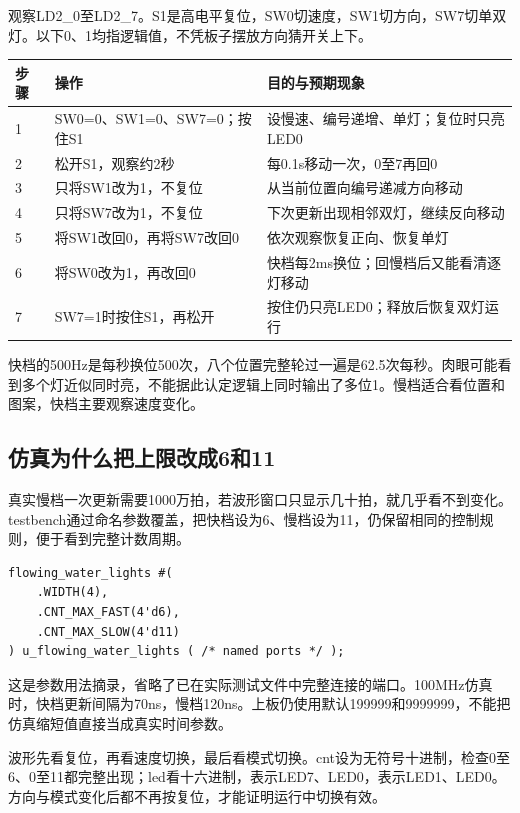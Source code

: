 观察LD2\_0至LD2\_7。S1是高电平复位，SW0切速度，SW1切方向，SW7切单双灯。以下0、1均指逻辑值，不凭板子摆放方向猜开关上下。
\begin{center}
\begin{tabularx}{\linewidth}{@{}lXX@{}}\toprule
步骤 & 操作 & 目的与预期现象\\\midrule
1 & SW0=0、SW1=0、SW7=0；按住S1 & 设慢速、编号递增、单灯；复位时只亮LED0\\
2 & 松开S1，观察约2秒 & 每0.1s移动一次，0至7再回0\\
3 & 只将SW1改为1，不复位 & 从当前位置向编号递减方向移动\\
4 & 只将SW7改为1，不复位 & 下次更新出现相邻双灯，继续反向移动\\
5 & 将SW1改回0，再将SW7改回0 & 依次观察恢复正向、恢复单灯\\
6 & 将SW0改为1，再改回0 & 快档每2ms换位；回慢档后又能看清逐灯移动\\
7 & SW7=1时按住S1，再松开 & 按住仍只亮LED0；释放后恢复双灯运行\\\bottomrule
\end{tabularx}
\end{center}
快档的500Hz是每秒换位500次，八个位置完整轮过一遍是62.5次每秒。肉眼可能看到多个灯近似同时亮，不能据此认定逻辑上同时输出了多位1。慢档适合看位置和图案，快档主要观察速度变化。

\subsection{仿真为什么把上限改成6和11}
真实慢档一次更新需要1000万拍，若波形窗口只显示几十拍，就几乎看不到变化。testbench通过命名参数覆盖，把快档设为6、慢档设为11，仍保留相同的控制规则，便于看到完整计数周期。
\begin{lstlisting}
flowing_water_lights #(
    .WIDTH(4),
    .CNT_MAX_FAST(4'd6),
    .CNT_MAX_SLOW(4'd11)
) u_flowing_water_lights ( /* named ports */ );
\end{lstlisting}
这是参数用法摘录，省略了已在实际测试文件中完整连接的端口。100MHz仿真时，快档更新间隔为70ns，慢档120ns。上板仍使用默认199999和9999999，不能把仿真缩短值直接当成真实时间参数。

波形先看复位，再看速度切换，最后看模式切换。cnt设为无符号十进制，检查0至6、0至11都完整出现；led看十六进制，表示LED7、LED0，表示LED1、LED0。方向与模式变化后都不再按复位，才能证明运行中切换有效。

